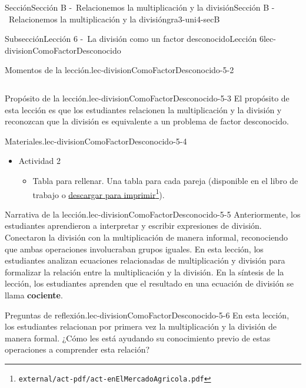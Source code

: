 \documentclass[oneside,10pt,]{article}
\newcommand{\terminology}[1]{\textbf{#1}}
\begin{document}
\begin{sectionptx}{Sección}{Sección B -~Relacionemos la multiplicación y la división}{}{Sección B -~Relacionemos la multiplicación y la división}{}{}{gra3-uni4-secB}
\begin{subsectionptx}{Subsección}{Lección 6 -~La división como un factor desconocido}{}{Lección 6}{}{}{lec-divisionComoFactorDesconocido}
\begin{introduction}{}
\begin{paragraphs}{Momentos de la lección.}{lec-divisionComoFactorDesconocido-5-2}
\begin{longtable}[l]{ll}
\end{longtable}
\end{paragraphs}%
\begin{paragraphs}{Propósito de la lección.}{lec-divisionComoFactorDesconocido-5-3}%
El propósito de esta lección es que los estudiantes relacionen la multiplicación y la división y reconozcan que la división es equivalente a un problema de factor desconocido.%
\end{paragraphs}%
\begin{paragraphs}{Materiales.}{lec-divisionComoFactorDesconocido-5-4}%
%
\begin{itemize}[label=\textbullet]
\item{}Actividad 2%
%
\begin{itemize}[label=$\circ$]
\item{}Tabla para rellenar. Una tabla para cada pareja (disponible en el libro de trabajo o \href{external/act-pdf/act-enElMercadoAgricola.pdf}{descargar para imprimir}\footnote{\nolinkurl{external/act-pdf/act-enElMercadoAgricola.pdf}\label{lec-divisionComoFactorDesconocido-5-4-2-1-2-1-2}}).%
\end{itemize}
\end{itemize}
\end{paragraphs}%
\begin{paragraphs}{Narrativa de la lección.}{lec-divisionComoFactorDesconocido-5-5}%
Anteriormente, los estudiantes aprendieron a interpretar y escribir expresiones de división. Conectaron la división con la multiplicación de manera informal, reconociendo que ambas operaciones involucraban grupos iguales. En esta lección, los estudiantes analizan ecuaciones relacionadas de multiplicación y división para formalizar la relación entre la multiplicación y la división. En la síntesis de la lección, los estudiantes aprenden que el resultado en una ecuación de división se llama \terminology{cociente}.%
\end{paragraphs}%
\begin{paragraphs}{Preguntas de reflexión.}{lec-divisionComoFactorDesconocido-5-6}%
En esta lección, los estudiantes relacionan por primera vez la multiplicación y la división de manera formal. ¿Cómo les está ayudando su conocimiento previo de estas operaciones a comprender esta relación?%
\end{paragraphs}%
\end{introduction}%
%
%
\typeout{************************************************}
\typeout{************************************************}

\end{subsectionptx}
\end{sectionptx}
\end{document}
